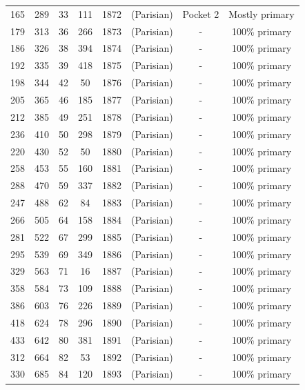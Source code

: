 \documentclass[12pt]{article}
\begin{document}
{\begin{tabular}{c|c|c|c|c|c|c|c}
        165 & 289 & 33 & 111 & 1872 & (Parisian) & Pocket 2 & Mostly primary \footnotemark[4] \\
        179 & 313 & 36 & 266 & 1873 & (Parisian) & - & 100\% primary \\
        186 & 326 & 38 & 394 & 1874 & (Parisian) & - & 100\% primary \\
        192 & 335 & 39 & 418 & 1875 & (Parisian) & - & 100\% primary \\
        198 & 344 & 42 & 50 & 1876 & (Parisian) & - & 100\% primary \\
        205 & 365 & 46 & 185 & 1877 & (Parisian) & - & 100\% primary \\
        212 & 385 & 49 & 251 & 1878 & (Parisian) & - & 100\% primary \\
        236 & 410 & 50 & 298 & 1879 & (Parisian) & - & 100\% primary \\
        220 & 430 & 52 & 50 & 1880 & (Parisian) & - & 100\% primary \\
        258 & 453 & 55 & 160 & 1881 & (Parisian) & - & 100\% primary \\
        288 & 470 & 59 & 337 & 1882 & (Parisian) & - & 100\% primary \\
        247 & 488 & 62 & 84 & 1883 & (Parisian) & - & 100\% primary \\
        266 & 505 & 64 & 158 & 1884 & (Parisian) & - & 100\% primary \\
        281 & 522 & 67 & 299 & 1885 & (Parisian) & - & 100\% primary \\
        295 & 539 & 69 & 349 & 1886 & (Parisian) & - & 100\% primary \\
        329 & 563 & 71 & 16 & 1887 & (Parisian) & - & 100\% primary \\
        358 & 584 & 73 & 109 & 1888 & (Parisian) & - & 100\% primary \\
        386 & 603 & 76 & 226 & 1889 & (Parisian) & - & 100\% primary \\
        418 & 624 & 78 & 296 & 1890 & (Parisian) & - & 100\% primary \\
        433 & 642 & 80 & 381 & 1891 & (Parisian) & - & 100\% primary \\
        312 & 664 & 82 & 53 & 1892 & (Parisian) & - & 100\% primary \\
        330 & 685 & 84 & 120 & 1893 & (Parisian) & - & 100\% primary \\
        
    \end{tabular}
    
    \label{table:silly table version 2}
\par}\\
\end{document}
